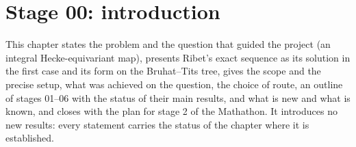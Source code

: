 \section*{Stage 00: introduction}\label{sec:stage-00}

This chapter states the problem and the question that guided the project (an integral Hecke-equivariant map), presents
Ribet's exact sequence as its solution in the first case and its form on the Bruhat--Tits tree, gives the scope and the precise
setup, what was achieved on the question, the choice of route, an outline of stages 01--06 with the status of their main results, and what is new
and what is known, and closes with the plan for stage 2 of the Mathathon. It introduces no new
results: every statement carries the status of the chapter where it is established.

\let\sOOthesection\thesection
\let\sOOtheHsection\theHsection
\renewcommand{\thesection}{0.\arabic{section}}
\renewcommand{\theHsection}{s00.\arabic{section}}















\setcounter{section}{0}
\let\thesection\sOOthesection
\let\theHsection\sOOtheHsection
